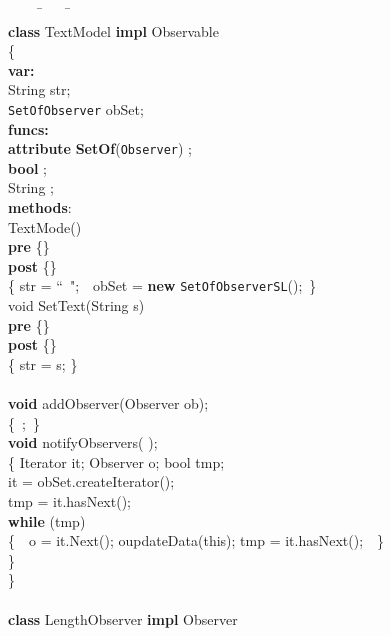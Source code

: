 \documentclass[fleqn]{llncs}
\begin{document}
\begin{figure}
\begin{center}
\begin{boxedminipage}{1\textwidth}
\scriptsize
\begin{tabbing}
\ \ \ \ \=\ \ \ \ \=\ \ \ \ \ \ \ \ \=\\
\textbf{class} TextModel \textbf{impl} Observable\\
\{\\
\textbf{var:}\\
    \>String str;\\
    \>\texttt{SetOfObserver}   obSet;\\
\textbf{funcs:}\\
    \>\textbf{attribute} \textbf{SetOf}(\texttt{Observer})  ;\\
    \>\textbf{bool} ;\\
    \>String ;\\
\textbf{methods}:\\
    \>TextMode()\\
    \>  \>\textbf{pre}       \>\{\}\\
    \>  \>\textbf{post}      \>\{\}\\
    \>  \>\{ str = ``\ ";\ \ obSet = \textbf{new} \texttt{SetOfObserverSL}();\ \}\\
    \>void SetText(String s)\\
    \>  \>\textbf{pre}       \>\{\}\\
    \>  \>\textbf{post}      \>\{\}\\
    \>  \>\{ str = s; \}\\
    \>  \>  \>\\
    \>\textbf{void}    addObserver(Observer ob);\\
    \>  \>  \{\ ;\ \}\\
    \>\textbf{void}    notifyObservers( );\\
    \>\{  \>Iterator it; Observer o; bool tmp;\\
    \>  \>it = obSet.createIterator();\\
    \>  \>tmp = it.hasNext();\\
    \>  \>\textbf{while} (tmp)\\
    \>  \>\{\ \ o = it.Next(); o\fldacc updateData(this); tmp = it.hasNext();\ \ \}\\
    \>\}\\
\}\\
\\
\textbf{class} LengthObserver \textbf{impl} Observer\\

\end{tabbing}
\end{boxedminipage}
\end{center}
\end{figure}
\end{document}
